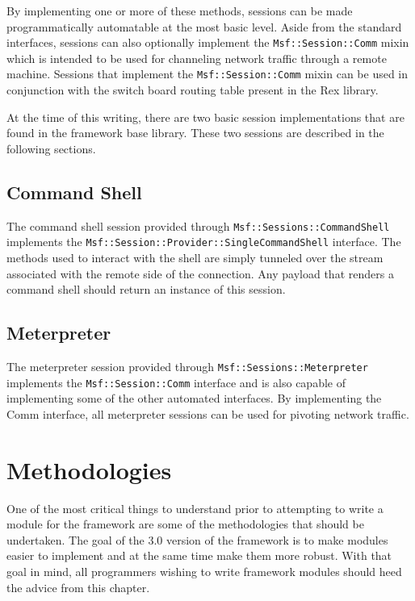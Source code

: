 \documentclass{report}
\begin{document}
\par
By implementing one or more of these methods, sessions can be made
programmatically automatable at the most basic level.  Aside from
the standard interfaces, sessions can also optionally implement the
\texttt{Msf::Session::Comm} mixin which is intended to be used for
channeling network traffic through a remote machine.  Sessions that
implement the \texttt{Msf::Session::Comm} mixin can be used in
conjunction with the switch board routing table present in the Rex
library.

\par
At the time of this writing, there are two basic session
implementations that are found in the framework base library.  These
two sessions are described in the following sections.

    \section{Command Shell}

\par
The command shell session provided through
\texttt{Msf::Sessions::CommandShell} implements the
\texttt{Msf::Session::Provider::SingleCommandShell} interface.  The
methods used to interact with the shell are simply tunneled over the
stream associated with the remote side of the connection.  Any
payload that renders a command shell should return an instance of
this session.

    \section{Meterpreter}

\par
The meterpreter session provided through
\texttt{Msf::Sessions::Meterpreter} implements the
\texttt{Msf::Session::Comm} interface and is also capable of
implementing some of the other automated interfaces.  By
implementing the Comm interface, all meterpreter sessions can be
used for pivoting network traffic.

\chapter{Methodologies}

\par
One of the most critical things to understand prior to attempting to
write a module for the framework are some of the methodologies that
should be undertaken.  The goal of the 3.0 version of the framework
is to make modules easier to implement and at the same time make
them more robust.  With that goal in mind, all programmers wishing
to write framework modules should heed the advice from this chapter.
\end{document}
